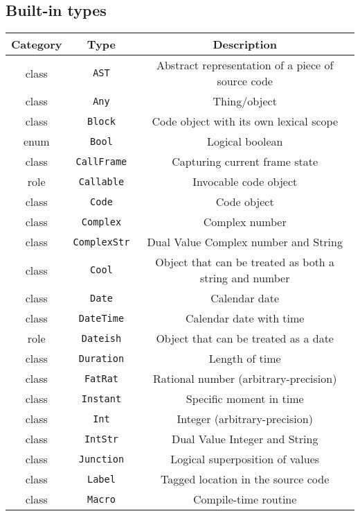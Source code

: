 \documentclass[14pt,english]{extarticle}
\providecommand{\tabularnewline}{\\}
\begin{document}
\subsection*{Built-in types}

\begin{longtable}{|c|c|c|}
\hline 
\textbf{\small{}Category} &
\textbf{\small{}Type} &
\textbf{\small{}Description}\tabularnewline
\hline 
\hline 
{\small{}class} &
\texttt{\small{}AST} &
{\small{}Abstract representation of a piece of source code}\tabularnewline
\hline 
{\small{}class} &
\texttt{\small{}Any} &
{\small{}Thing/object}\tabularnewline
\hline 
{\small{}class} &
\texttt{\small{}Block} &
{\small{}Code object with its own lexical scope}\tabularnewline
\hline 
{\small{}enum} &
\texttt{\small{}Bool} &
{\small{}Logical boolean}\tabularnewline
\hline 
{\small{}class} &
\texttt{\small{}CallFrame} &
{\small{}Capturing current frame state}\tabularnewline
\hline 
{\small{}role} &
\texttt{\small{}Callable} &
{\small{}Invocable code object}\tabularnewline
\hline 
{\small{}class} &
\texttt{\small{}Code} &
{\small{}Code object}\tabularnewline
\hline 
{\small{}class} &
\texttt{\small{}Complex} &
{\small{}Complex number}\tabularnewline
\hline 
{\small{}class} &
\texttt{\small{}ComplexStr} &
{\small{}Dual Value Complex number and String}\tabularnewline
\hline 
{\small{}class} &
\texttt{\small{}Cool} &
{\small{}Object that can be treated as both a string and number}\tabularnewline
\hline 
{\small{}class} &
\texttt{\small{}Date} &
{\small{}Calendar date}\tabularnewline
\hline 
{\small{}class} &
\texttt{\small{}DateTime} &
{\small{}Calendar date with time}\tabularnewline
\hline 
{\small{}role} &
\texttt{\small{}Dateish} &
{\small{}Object that can be treated as a date}\tabularnewline
\hline 
{\small{}class} &
\texttt{\small{}Duration} &
{\small{}Length of time}\tabularnewline
\hline 
{\small{}class} &
\texttt{\small{}FatRat} &
{\small{}Rational number (arbitrary-precision)}\tabularnewline
\hline 
{\small{}class} &
\texttt{\small{}Instant} &
{\small{}Specific moment in time}\tabularnewline
\hline 
{\small{}class} &
\texttt{\small{}Int} &
{\small{}Integer (arbitrary-precision)}\tabularnewline
\hline 
{\small{}class} &
\texttt{\small{}IntStr} &
{\small{}Dual Value Integer and String}\tabularnewline
\hline 
{\small{}class} &
\texttt{\small{}Junction} &
{\small{}Logical superposition of values}\tabularnewline
\hline 
{\small{}class} &
\texttt{\small{}Label} &
{\small{}Tagged location in the source code}\tabularnewline
\hline 
{\small{}class} &
\texttt{\small{}Macro} &
{\small{}Compile-time routine}\tabularnewline

\end{longtable}
\end{document}
